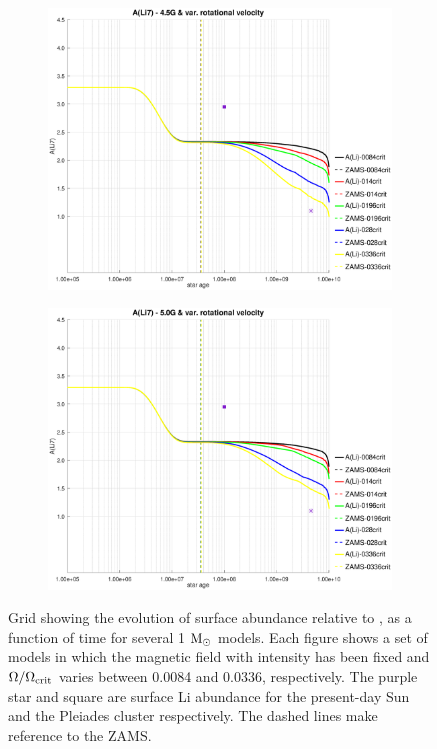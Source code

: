 \documentclass[fleqn,usenatbib]{mnras}
\begin{document}
{{\begin{figure}
    \begin{subfigure}[h]{0.47\textwidth}
    \includegraphics[trim = 35mm 15mm 20mm 15mm, clip,width=\textwidth]{figures/li_var_vel_4_5g.eps}
    \label{fig:subim5}
    \end{subfigure}
    \begin{subfigure}[h]{0.47\textwidth}
    \includegraphics[trim = 35mm 15mm 20mm 15mm, clip,width=\textwidth]{figures/li_var_vel_5_0g.eps}
    \label{fig:subim6}
    \end{subfigure}
\caption{Grid showing the evolution of surface  abundance relative to , as a function of time for several 1 $\mathrm{M}_\odot$ models. Each figure shows a set of models in which the magnetic field with intensity has been fixed and $\Omega / \Omega_{\mathrm{crit}}$ varies between 0.0084 and 0.0336, respectively. The purple star and square are surface Li abundance for the present-day Sun \citep{Asplund2009} and the Pleiades cluster \citep{Sestito2005} respectively. The dashed lines make reference to the ZAMS.}
\label{fig:grid_li_var_vel}
\end{figure}
\par


}}
\end{document}
